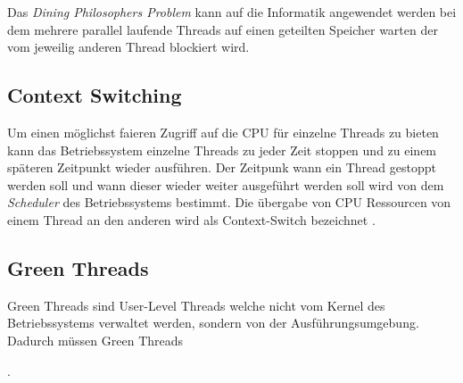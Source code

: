 Das \emph{Dining Philosophers Problem} kann auf die Informatik angewendet werden bei dem mehrere parallel laufende Threads auf einen geteilten Speicher warten der vom jeweilig anderen Thread blockiert wird. 

\subsection{Context Switching}
Um einen möglichst faieren Zugriff auf die CPU für einzelne Threads zu bieten kann das Betriebssystem einzelne Threads zu jeder Zeit stoppen und zu einem späteren Zeitpunkt wieder ausführen. Der Zeitpunk wann ein Thread gestoppt werden soll und wann dieser wieder weiter ausgeführt werden soll wird von dem \emph{Scheduler} des Betriebssystems bestimmt. Die übergabe von CPU Ressourcen von einem Thread an den anderen wird als Context-Switch bezeichnet \cite[p. 23]{Sto2013}. 







\subsection{Green Threads}
Green Threads sind User-Level Threads welche nicht vom Kernel des Betriebssystems verwaltet werden, sondern von der Ausführungsumgebung. Dadurch müssen Green Threads 


 \cite[p.2]{Sun01}.



